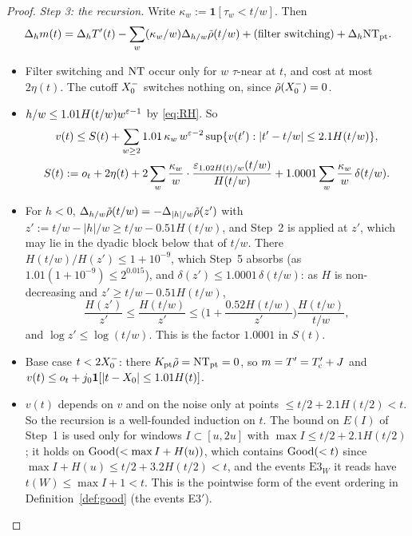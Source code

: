 \begin{proof}
\emph{Step 3: the recursion.} Write $\kappa_w:=\mathbf 1[\tau_w<t/w]$. Then
\[
  \Delta_hm(t)=\Delta_hT'(t)-\sum_w(\kappa_w/w)\Delta_{h/w}\tilde\rho(t/w)+(\text{filter switching})+\Delta_h\mathrm{NT}_{\mathrm{pt}}.
\]
\begin{itemize}
\item Filter switching and $\mathrm{NT}$ occur only for $w$ $\tau$-near at $t$, and cost at most $2\eta(t)$. The cutoff $X_0^{-}$ switches
  nothing on, since $\tilde\rho(X_0^{-})=0$.
\item $h/w\le1.01H(t/w)w^{\varepsilon-1}$ by \eqref{eq:RH}. So
  \begin{gather*}
    v(t)\le S(t)+\sum_{w\ge2}1.01\,\kappa_w\,w^{\varepsilon-2}\sup\{v(t'):|t'-t/w|\le2.1H(t/w)\},\\
    S(t):=o_t+2\eta(t)+2\sum_w\frac{\kappa_w}w\cdot\frac{\varepsilon_{1.02H(t)/w}(t/w)}{H(t/w)}+1.0001\sum_w\frac{\kappa_w}w\,\delta(t/w) .
  \end{gather*}
\item For $h<0$, $\Delta_{h/w}\tilde\rho(t/w)=-\Delta_{|h|/w}\tilde\rho(z')$ with $z':=t/w-|h|/w\ge t/w-0.51H(t/w)$, and Step~2 is applied
  at $z'$, which may lie in the dyadic block below that of $t/w$. There $H(t/w)/H(z')\le1+10^{-9}$, which Step~5 absorbs
  (as $1.01(1+10^{-9})\le2^{0.015}$), and $\delta(z')\le1.0001\,\delta(t/w)$: as $H$ is non-decreasing and $z'\ge t/w-0.51H(t/w)$,
  \[
    \frac{H(z')}{z'}\le\frac{H(t/w)}{z'}\le\Big(1+\frac{0.52H(t/w)}{z'}\Big)\frac{H(t/w)}{t/w},
  \]
  and $\log z'\le\log(t/w)$. This is the factor $1.0001$ in $S(t)$.
\item Base case $t<2X_0^{-}$: there $K_{\mathrm{pt}}\tilde\rho=\mathrm{NT}_{\mathrm{pt}}=0$, so $m=T'=T'_{\mathrm{c}}+J$ and
  $v(t)\le o_t+j_0\mathbf 1[|t-X_0|\le1.01H(t)]$.
\item $v(t)$ depends on $v$ and on the noise only at points $\le t/2+2.1H(t/2)<t$. So the recursion is a well-founded
  induction on $t$. The bound on $E(I)$ of Step~1 is used only for windows $I\subset[u,2u]$ with $\max I\le t/2+2.1H(t/2)$; it holds on
$\mathrm{Good}(<\max I+H(u))$, which contains $\mathrm{Good}(<t)$ since $\max I+H(u)\le t/2+3.2H(t/2)<t$, and the events $\mathrm{E3}_W$ it reads have
$t(W)\le\max I+1<t$. This is the pointwise form of the event ordering in Definition~\ref{def:good} (the
  events E3$'$).
\end{itemize}


\end{proof}
